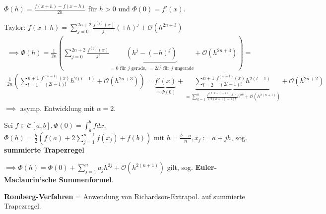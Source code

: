 \begin{example}
	$\Phi(h) = \frac{f(x+h)-f(x-h)}{2h}$ für $h>0$ und $\Phi(0) = f'(x)$.
	
	Taylor: $f(x\pm h) = \sum_{j=0}^{2n+2} \frac{f^{(j)}(x)}{j!}(\pm h)^j + \mathcal{O}(h^{2n+3})$
	\begin{align*}
		\implies \Phi(h) = \frac{1}{2n} \left(\sum_{j=0}^{2n+2} \frac{f^{(j)}(x)}{j!} \underbrace{(h^j - (-h)^j)}_{=0 \text{ für } j \text{ gerade, } = 2h^j \text{ für } j \text{ ungerade}} + \mathcal{O}(h^{2n+3}) \right) =\\
		\frac{1}{2n} \left(\sum_{l=1}^{n+1} \frac{f^{(2l-1)}(x)}{(2l-1)!} h^{2(l-1)} + \mathcal{O}(h^{2n+3}) \right) = \underbrace{f'(x)}_{=\Phi(0)} + \underbrace{\sum_{l=2}^{n+1} \frac{f^{(2l-1)}(x)}{(2l-1)!} h^{2(l-1)}}_{= \sum_{k=1}^{n} \frac{f^{(2(k+1)-1)}(x)}{(2(k+1)-1)!}h^{2k} + \mathcal{O}(h^{2(n+1)})} + \mathcal{O}(h^{2n+2})
	\end{align*}
	$\implies$ asymp. Entwicklung mit $\alpha=2$.
\end{example}



\begin{example}
	Sei $f \in \mathcal{C}[a,b], \Phi(0) = \int_a^b f dx$. $\Phi(h) = \frac{h}{2} \left(f(a) + 2 \sum_{j=1}^{n-1}f(x_j) + f(b)\right)$ mit $h = \frac{b-a}{n}, x_j := a + jh$, sog. \textbf{summierte Trapezregel}
	
	$\implies \Phi(h) = \Phi(0) + \sum_{j=1}^{n} a_j h^{2j} + \mathcal{O}(h^{2(n+1)})$ gilt, sog. \textbf{Euler-Maclaurin'sche Summenformel}.
	
	\textbf{Romberg-Verfahren} = Anwendung von Richardson-Extrapol. auf summierte Trapezregel.
\end{example}

